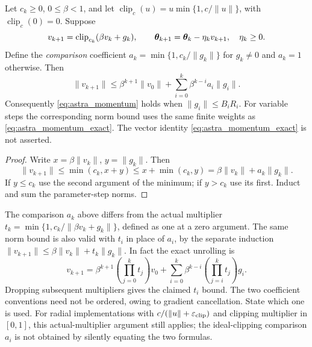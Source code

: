 \begin{lemma}
\label{lem:astra_velocity}
Let $c_k\ge0$, $0\le\beta<1$, and let
$\operatorname{clip}_{c}(u)=u\min\{1,c/\|u\|\}$, with
$\operatorname{clip}_{c}(0)=0$. Suppose
\[
 v_{k+1}=\operatorname{clip}_{c_k}(\beta v_k+g_k),\qquad
 {\boldsymbol{\theta}}_{k+1}={\boldsymbol{\theta}}_k-\eta_kv_{k+1},\quad \eta_k\ge0.
\]
Define the \emph{comparison} coefficient
$a_k=\min\{1,c_k/\|g_k\|\}$ for $g_k\ne0$ and $a_k=1$ otherwise.
Then
\[
 \|v_{k+1}\|\le\beta^{k+1}\|v_0\|
       +\sum_{i=0}^k\beta^{k-i}a_i\|g_i\|.
\]
Consequently \eqref{eq:astra_momentum} holds when
$\|g_i\|\le B_iR_i$. For variable steps the corresponding norm bound
uses the same finite weights as \eqref{eq:astra_momentum_exact}.
The vector identity \eqref{eq:astra_momentum_exact} is not asserted.
\end{lemma}
\begin{proof}
Write $x=\beta\|v_k\|$, $y=\|g_k\|$. Then
\[
 \|v_{k+1}\|\le\min(c_k,x+y)\le x+\min(c_k,y)
 =\beta\|v_k\|+a_k\|g_k\|.
\]
If $y\le c_k$ use the second argument of the minimum; if $y>c_k$ use
its first. Induct and sum the parameter-step norms.
\end{proof}
\begin{remark}
The comparison $a_k$ above differs from the actual multiplier
$t_k=\min\{1,c_k/\|\beta v_k+g_k\|\}$, defined as one at a zero
argument. The same norm bound is also valid with $t_i$ in place of
$a_i$, by the separate induction
$\|v_{k+1}\|\le\beta\|v_k\|+t_k\|g_k\|$.
In fact the exact unrolling is
\[
 v_{k+1}=\beta^{k+1}\left(\prod_{j=0}^kt_j\right)v_0
 +\sum_{i=0}^k\beta^{k-i}\left(\prod_{j=i}^kt_j\right)g_i.
\]
Dropping subsequent multipliers gives the claimed $t_i$ bound.
The two coefficient conventions need not be ordered, owing to gradient
cancellation. State which one is used. For radial implementations with
$c/(\|u\|+\varepsilon_{\rm clip})$ and clipping multiplier in $[0,1]$,
this actual-multiplier argument still applies; the ideal-clipping
comparison $a_i$ is not obtained by silently equating the two formulas.
\end{remark}

